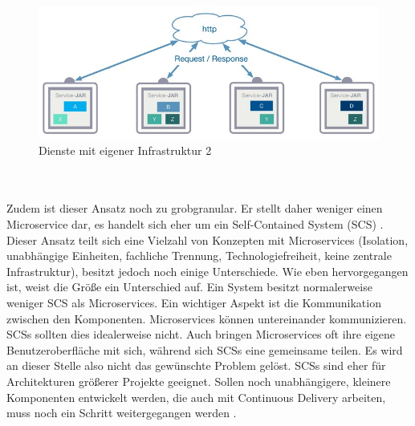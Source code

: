 \begin{figure}[h!]
	\centering
	\includegraphics[width=1.0\linewidth]{images/mp3}
	\caption{Dienste mit eigener Infrastruktur 2\cite{LarsRowekamp.2017d}}
	\label{fig:mp22}
\end{figure}
\\ \\Zudem ist dieser Ansatz noch zu grobgranular. Er stellt daher weniger einen Microservice dar, es handelt sich eher um ein Self-Contained System (SCS) \cite{jaxcenter.2016}. Dieser Ansatz teilt sich eine Vielzahl von Konzepten mit Microservices (Isolation, unabhängige Einheiten, fachliche Trennung, Technologiefreiheit, keine zentrale Infrastruktur), besitzt jedoch noch einige Unterschiede. Wie eben hervorgegangen ist, weist die Größe ein Unterschied auf. Ein System besitzt normalerweise weniger SCS als Microservices. Ein wichtiger Aspekt ist die Kommunikation zwischen den Komponenten. Microservices können untereinander kommunizieren. SCSs sollten dies idealerweise nicht. Auch bringen Microservices oft ihre eigene Benutzeroberfläche mit sich, während sich SCSs eine gemeinsame teilen. Es wird an dieser Stelle also nicht das gewünschte Problem gelöst. SCSs sind eher für Architekturen größerer Projekte geeignet. Sollen noch unabhängigere, kleinere Komponenten entwickelt werden, die auch mit Continuous Delivery arbeiten, muss noch ein Schritt weitergegangen werden \cite{selfcontainedservices.2017}.

 